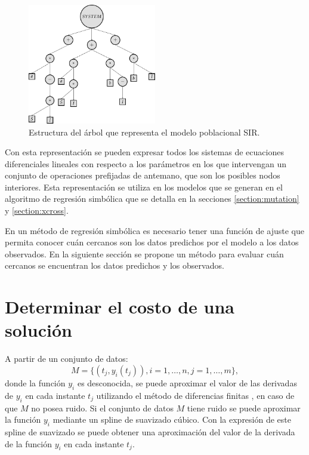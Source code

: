 \begin{figure}[h]
    \centering
    \includegraphics[width=0.5\textwidth]{"figures/sir_example.pdf"}
    \caption{Estructura del árbol que representa el modelo poblacional SIR.}
    \label{tikzpicture:sir_example}
\end{figure}

Con esta representación se pueden expresar todos los sistemas de ecuaciones diferenciales lineales con respecto a los parámetros en los que intervengan un conjunto de operaciones prefijadas de antemano, que son los posibles nodos interiores. Esta representación se utiliza en los modelos que se generan en el algoritmo de regresión simbólica que se detalla en la secciones \ref{section:mutation} y \ref{section:xcross}.

En un método de regresión simbólica es necesario tener una función de ajuste que permita conocer cuán cercanos son los datos predichos por el modelo a los datos observados. En la siguiente sección se propone un método para evaluar cuán cercanos se encuentran los datos predichos y los observados.

\section{Determinar el costo de una solución}\label{section:solution_cost}

A partir de un conjunto de datos:
$$M = \{(t_j, y_i(t_j)), i = 1, \dots, n, j = 1, \dots, m\},$$
donde la función $y_i$ es desconocida, se puede aproximar el valor de las derivadas de $y_i$ en cada instante $t_j$ utilizando el método de diferencias finitas \cite{gaucel2014learning}, en caso de que $M$ no posea ruido. Si el conjunto de datos $M$ tiene ruido se puede aproximar la función $y_i$ mediante un spline de suavizado cúbico. Con la expresión de este spline de suavizado se puede obtener una aproximación del valor de la derivada de la función $y_i$ en cada instante $t_j$.

